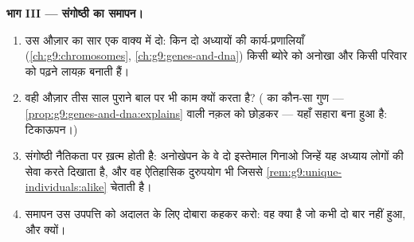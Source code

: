\begin{problem}[{सप्ताहांत समस्या --- एक बाल, तीन सवाल, तीस
साल}]
\medskip\noindent\textbf{भाग III --- संगोष्ठी का समापन।}
\begin{enumerate}[resume]
  \item उस औज़ार का सार एक वाक्य में दो: किन दो अध्यायों की
        कार्य-प्रणालियाँ (\cref{ch:g9:chromosomes},
        \cref{ch:g9:genes-and-dna}) किसी ब्योरे को अनोखा और किसी
        परिवार को पढ़ने लायक़ बनाती हैं।
  \item वही औज़ार तीस साल पुराने बाल पर भी काम क्यों करता है? ( का
        कौन-सा गुण --- \cref{prop:g9:genes-and-dna:explains} वाली
        नक़ल को छोड़कर --- यहाँ सहारा बना हुआ है: टिकाऊपन।)
  \item संगोष्ठी नैतिकता पर ख़त्म होती है: अनोखेपन के वे दो इस्तेमाल
        गिनाओ जिन्हें यह अध्याय लोगों की सेवा करते दिखाता है, और वह
        ऐतिहासिक दुरुपयोग भी जिससे
        \cref{rem:g9:unique-individuals:alike} चेताती है।
  \item समापन उस उपपत्ति को अदालत के लिए दोबारा कहकर करो: वह क्या है
        जो कभी दो बार नहीं हुआ, और क्यों।
\end{enumerate}
\end{problem}
